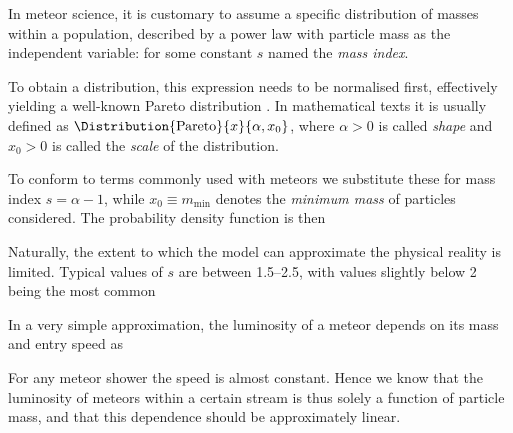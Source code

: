                 In meteor science, it is customary to assume a specific distribution of masses within a population,
                described by a power law with particle mass as the independent variable:
                for some constant $s$ named the \emph{mass index}.

                To obtain a distribution, this expression needs to be normalised first,
                effectively yielding a well-known Pareto distribution \citep{arnold1983}.
                In mathematical texts it is usually defined as $\Distribution{\mathrm{Pareto}}{x}{\alpha, x_0}$,
                where $\alpha > 0$ is called \emph{shape} and $x_0 > 0$ is called the \emph{scale} of the distribution.

                To conform to terms commonly used with meteors we substitute these for mass index
                $s = \alpha - 1$, while $x_0 \equiv m_\mathrm{min}$ denotes the \emph{minimum mass}
                of particles considered. The probability density function is then

                Naturally, the extent to which the model can approximate the physical reality is limited.
                Typical values of $s$ are between \numrange{1.5}{2.5}, with values slightly below 2 being the most common \cite{...}

                In a very simple approximation, the luminosity of a meteor depends on its mass and entry speed as

                For any meteor shower the speed is almost constant. Hence we know that the luminosity of meteors
                within a certain stream is thus solely a function of particle mass, and that this dependence should
                be approximately linear.


